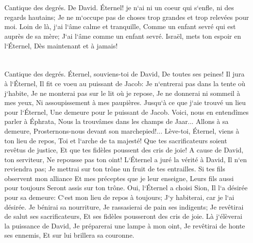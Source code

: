 \chapter{}

\verse Cantique des degrés. De David. Éternel! je n`ai ni un coeur qui s`enfle, ni des regards hautains; Je ne m`occupe pas de choses trop grandes et trop relevées pour moi. 
\verse Loin de là, j`ai l`âme calme et tranquille, Comme un enfant sevré qui est auprès de sa mère; J`ai l`âme comme un enfant sevré. 
\verse Israël, mets ton espoir en l`Éternel, Dès maintenant et à jamais! 

\chapter{}

\verse Cantique des degrés. Éternel, souviens-toi de David, De toutes ses peines! 
\verse Il jura à l`Éternel, Il fit ce voeu au puissant de Jacob: 
\verse Je n`entrerai pas dans la tente où j`habite, Je ne monterai pas sur le lit où je repose, 
\verse Je ne donnerai ni sommeil à mes yeux, Ni assoupissement à mes paupières. 
\verse Jusqu`à ce que j`aie trouvé un lieu pour l`Éternel, Une demeure pour le puissant de Jacob. 
\verse Voici, nous en entendîmes parler à Éphrata, Nous la trouvâmes dans les champs de Jaar... 
\verse Allons à sa demeure, Prosternons-nous devant son marchepied!... 
\verse Lève-toi, Éternel, viens à ton lieu de repos, Toi et l`arche de ta majesté! 
\verse Que tes sacrificateurs soient revêtus de justice, Et que tes fidèles poussent des cris de joie! 
\verse A cause de David, ton serviteur, Ne repousse pas ton oint! 
\verse L`Éternel a juré la vérité à David, Il n`en reviendra pas; Je mettrai sur ton trône un fruit de tes entrailles. 
\verse Si tes fils observent mon alliance Et mes préceptes que je leur enseigne, Leurs fils aussi pour toujours Seront assis sur ton trône. 
\verse Oui, l`Éternel a choisi Sion, Il l`a désirée pour sa demeure: 
\verse C`est mon lieu de repos à toujours; J`y habiterai, car je l`ai désirée. 
\verse Je bénirai sa nourriture, Je rassasierai de pain ses indigents; 
\verse Je revêtirai de salut ses sacrificateurs, Et ses fidèles pousseront des cris de joie. 
\verse Là j`élèverai la puissance de David, Je préparerai une lampe à mon oint, 
\verse Je revêtirai de honte ses ennemis, Et sur lui brillera sa couronne. 

\chapter{}

